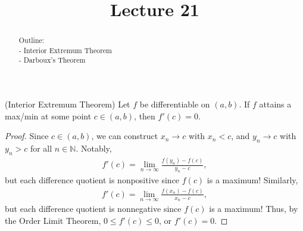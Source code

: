\documentclass{ximera}
\begin{document}
    \title{Lecture 21}
    
    \begin{abstract}  
    Outline: \\
    - Interior Extremum Theorem \\
    - Darboux's Theorem 
\end{abstract}

\maketitle


\begin{theorem}{(Interior Extremum Theorem)}
    Let $f$ be differentiable on $(a,b)$.  If $f$ attains a max/min at some point $c \in (a,b)$, then $f'(c) = 0$.
\end{theorem}
\begin{proof}
    Since $c \in (a,b)$, we can construct $x_n \to c$ with $x_n < c$, and $y_n \to c$ with $y_n > c$ for all $n \in \mathbb{N}$.  Notably,
    \begin{align*}
        f'(c) = \lim\limits_{n\to \infty} \frac{f(y_n) - f(c)}{y_n - c}, 
    \end{align*}
    but each difference quotient is nonpositive since $f(c)$ is a maximum!  Similarly, 
    \begin{align*}
        f'(c) = \lim\limits_{n\to \infty} \frac{f(x_n) - f(c)}{x_n - c}, 
    \end{align*}
    but each difference quotient is nonnegative since $f(c)$ is a maximum!  Thus, by the Order Limit Theorem, $0 \leq f'(c) \leq 0$, or $f'(c)=0$.
\end{proof}
\end{document}
